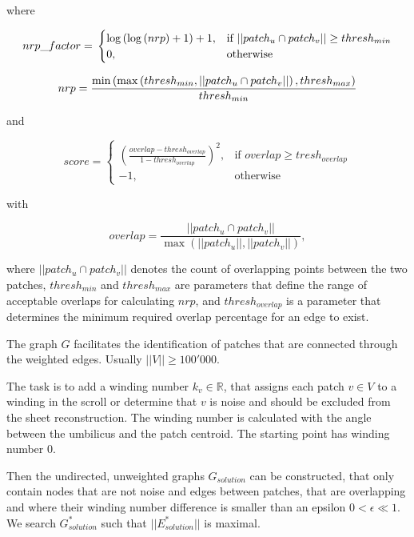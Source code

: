\documentclass[peerreview]{IEEEtran}
\begin{document}
where

\begin{dmath}
nrp\_factor = \\
\begin{cases}
\log \left( \log \left( nrp \right) + 1 \right) + 1,& \text{if } ||patch_u \cap patch_v|| \geq thresh_{min} \\
    0,             & \text{otherwise}
\end{cases}
\end{dmath}

\begin{dmath}
    nrp = \\
    \frac{\min \left( \max \left(thresh_{min}, ||patch_u \cap patch_v||\right), thresh_{max} \right)}{thresh_{min}}
\end{dmath}

and

\begin{dmath}
    score =
\begin{cases}
    \left(\frac{overlap - thresh_{overlap}}{1 - thresh_{overlap}}\right)^2,& \text{if } overlap\geq tresh_{overlap} \\
    -1,              & \text{otherwise}
\end{cases}
\end{dmath}

with

\[
overlap = \frac{||patch_u \cap patch_v||}{\max (||patch_u||, ||patch_v||)},
\]

where \(||patch_u \cap patch_v||\) denotes the count of overlapping points between the two patches, \(thresh_{min}\) and \(thresh_{max}\) are parameters that define the range of acceptable overlaps for calculating \(nrp\), and \(thresh_{overlap}\) is a parameter that determines the minimum required overlap percentage for an edge to exist.

The graph \(G\) facilitates the identification of patches that are connected through the weighted edges. Usually $||V|| \geq 100'000$.

The task is to add a winding number $k_v \in \mathbb{R}$, that assigns each patch $v \in V$ to a winding in the scroll or determine that $v$ is noise and should be excluded from the sheet reconstruction. The winding number is calculated with the angle between the umbilicus and the patch centroid. The starting point has winding number $0$. 

Then the undirected, unweighted graphs \(G_{solution}\) can be constructed, that only contain nodes that are not noise and edges between patches, that are overlapping and where their winding number difference is smaller than an epsilon $0 < \epsilon \ll 1$.  We search \(G_{solution}^{*}\) such that $||E_{solution}^{*}||$ is maximal.
\end{document}
